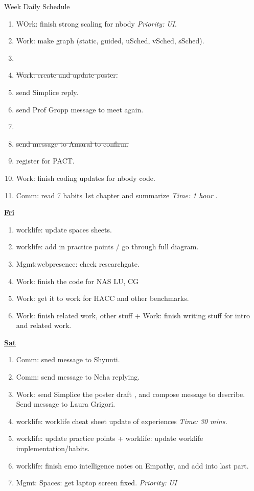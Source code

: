 \documentclass[serif,mathserif,final]{beamer}
\newcommand{\doneTask}[1]{\item \sout{#1}}
\newcommand{\timeEst}[1]{\textit{Time:} \textit{#1}}
\newcommand{\priority}[1]{\textit{Priority:} \textit{#1}}
\begin{document}
\begin{frame}{}
\begin{columns}[t]
\begin{column}{0.50\linewidth}
\begin{block}{Week Daily Schedule}
\begin{enumerate}
\item \tiny WOrk: finish strong scaling for nbody  \priority{UI}. 
\item \tiny Work: make graph (static, guided, uSched, vSched, sSched). 
\item \tiny \doneTask{Work: create and update poster. }

\item \tiny send Simplice reply. 
\item \tiny send Prof Gropp message to meet again. 
\item \tiny \doneTask{send message to Amaral to confirm.}
\item \tiny register for PACT. 
\item \tiny Work: finish coding updates for nbody code. 
\item \tiny Comm: read 7 habits 1st chapter and summarize \timeEst{1 hour} . 
\end{enumerate}


\textbf{\small {\underline{Fri}}} 
\begin{enumerate} 
\tiny \item \tiny worklife: update spaces sheets.
\item \tiny worklife: add in practice points / go through full diagram. 
\item \tiny Mgmt:webpresence: check researchgate. 
\item \tiny Work: finish the code for NAS LU, CG
\item \tiny  Work: get it to work for HACC and other benchmarks. 
\item \tiny Work: finish related work, other stuff + Work: finish writing stuff for intro and related work. 
\end{enumerate}

\textbf{\small \underline{Sat}} 
\begin{enumerate} 
\tiny \item \tiny Comm: sned message to Shyunti. 
\item \tiny Comm: send message to Neha replying. 
\item \tiny Work: send Simplice the poster draft , and compose message to describe.   Send message to Laura Grigori. 
\item \tiny worklife: worklife cheat sheet update of experiences \timeEst{30 mins.} 
\item \tiny worklife: update practice points + worklife: update worklife implementation/habits. 
\item \tiny worklife: finish emo intelligence notes on Empathy, and add into last part. 
\item \tiny Mgmt: Spaces: get laptop screen fixed. \priority{UI} 
\end{enumerate} 


\end{block}
\end{column}
\end{columns}
\end{frame}
\end{document}
